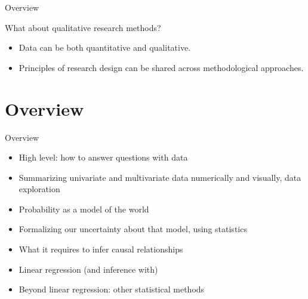 \documentclass[xcolor={dvipsnames}, handout]{beamer}
\begin{document}
\begin{frame}{Overview}

What about qualitative research methods? \pause
\begin{itemize}
\item Data can be both quantitative and qualitative. \pause
\item Principles of research design can be shared across methodological approaches. 
\end{itemize}

\end{frame}



\section{Overview}
\begin{frame}{Overview}

\begin{itemize}
\item High level: how to answer questions with data \pause
\item Summarizing univariate and multivariate data numerically and visually, data exploration \pause
\item Probability as a model of the world \pause
\item Formalizing our uncertainty about that model, using statistics \pause
\item What it requires to infer causal relationships \pause
\item Linear regression \pause (and inference with) \pause
\item Beyond linear regression: other statistical methods
\end{itemize}

\end{frame}


\end{document}
